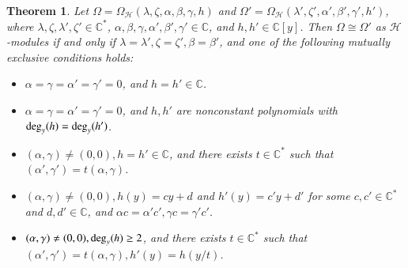 \documentclass[12pt,reqno]{amsart}
\def\deg{{\rm deg}}
\numberwithin{equation}{section}
\newtheorem{theo}{Theorem}[section]
\begin{document}
\begin{theo}\label{theo 5.2}
Let
$\Omega=\Omega_{\mathcal{H}}(\lambda,\zeta,\alpha,\beta,\gamma,h)$ and
$\Omega'=\Omega_{\mathcal{H}}(\lambda',\zeta',\alpha',\beta',\gamma',h')$,
where $\lambda,\zeta,\lambda',\zeta'\in\mathbb C^*$, $\alpha,\beta,\gamma,\alpha',\beta',\gamma'\in\mathbb C$, and $h,h'\in\mathbb C[y]$. Then $\Omega\cong\Omega'$ as $\mathcal{H}$-modules if and only if
$\lambda=\lambda', \zeta=\zeta', \beta=\beta'$,
and one of the following mutually exclusive conditions holds:
\begin{itemize}
\item[{\rm (1)}] $\alpha=\gamma=\alpha'=\gamma'=0$, and $h=h'\in\mathbb C$.
\item[{\rm (2)}] $\alpha=\gamma=\alpha'=\gamma'=0$, and $h,h'$ are nonconstant polynomials with $\deg_y (h)=\deg_y (h')$.
\item[{\rm (3)}] $(\alpha,\gamma)\ne(0,0), h=h'\in\mathbb C$, and there exists $t\in\mathbb C^*$ such that $(\alpha',\gamma')=t(\alpha,\gamma)$.
\item[{\rm (4)}] $(\alpha,\gamma)\ne(0,0), h(y)=cy+d$ and $h'(y)=c'y+d'$ for some $c,c'\in\mathbb C^*$ and $d,d'\in\mathbb C$, and
$\alpha c=\alpha'c',\gamma c=\gamma'c'$.
\item[{\rm (5)}] $(\alpha,\gamma)\ne(0,0), \deg_y (h)\ge2$, and there exists $t\in\mathbb C^*$ such that
$(\alpha',\gamma')=t(\alpha,\gamma),h'(y)=h(y/t)$.
\end{itemize}
\end{theo}
\end{document}
